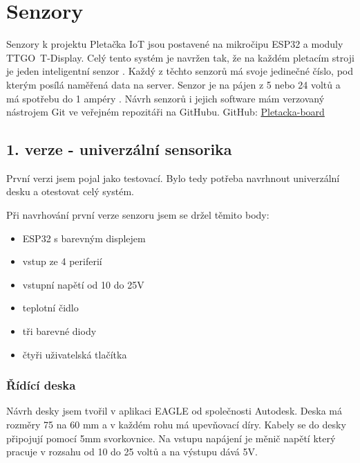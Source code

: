 \chapter{Senzory}

Senzory k projektu Pletačka IoT jsou postavené na mikročipu ESP32 a moduly TTGO~T-Display.
Celý tento systém je navržen tak, že na každém pletacím stroji je jeden inteligentní senzor .
Každý z těchto senzorů má svoje jedinečné číslo, pod kterým posílá naměřená data na server.
Senzor je na pájen z 5 nebo 24 voltů a má spotřebu do 1 ampéry .
Návrh senzorů i jejich software mám verzovaný nástrojem Git ve veřejném repozitáři na GitHubu.\newline
GitHub: \href{https://github.com/Pletacka-IoT/Pletacka-board}{Pletacka-board}\cite{PL_BOARD}

\section{1. verze - univerzální sensorika}

První verzi jsem pojal jako testovací. Bylo tedy potřeba navrhnout univerzální desku a otestovat celý systém.\newline

Při navrhování první verze senzoru jsem se držel těmito body:
\begin{itemize}
    \item ESP32 s barevným displejem
    \item vstup ze 4 periferií
    \item vstupní napětí od 10 do 25V
    \item teplotní čidlo
    \item tři barevné diody
    \item čtyři uživatelská tlačítka
\end{itemize}


\subsection{Řídící deska}
Návrh desky jsem tvořil v aplikaci EAGLE od společnosti Autodesk. 
Deska má rozměry 75 na 60 mm a v každém rohu má upevňovací díry. 
Kabely se do desky připojují pomocí 5mm svorkovnice.
Na vstupu napájení je měnič napětí který pracuje v rozsahu od 10 do 25 voltů a na výstupu dává 5V. 


